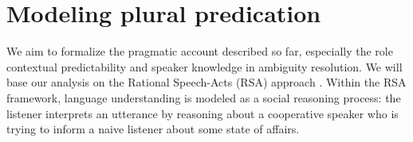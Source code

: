 \documentclass[preprint,12pt,authoryear,titlepage]{elsarticle}
\newcommand{\ndg}[1]{\textcolor{Green}{[ndg: #1]}}
\newcommand{\sem}[1]{\mbox{$[\![$#1$]\!]$}}
\begin{document}
\section{Modeling plural predication}
\label{model}


We aim to formalize the pragmatic account described so far, especially the role contextual predictability and speaker knowledge in ambiguity resolution.
We will base our analysis on the Rational Speech-Acts (RSA) approach \citep{frankgoodman2012,goodmanstuhlmuller2013}. Within the RSA framework, language understanding is modeled as a social reasoning process: the listener interprets an utterance by reasoning about a cooperative speaker who is trying to inform a naive listener about some state of affairs. 

\end{document}
